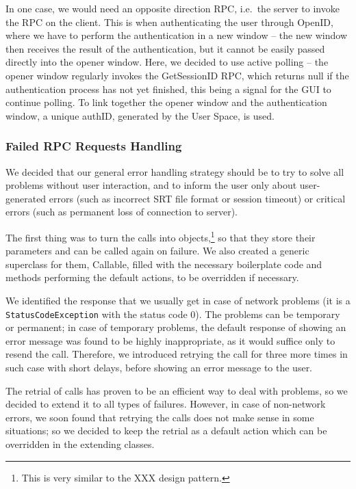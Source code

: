 In one case, we would need an opposite direction RPC, i.e.\ the server to invoke the RPC on the client. This is when authenticating the user through OpenID, where we have to perform the authentication in a new window -- the new window then receives the result of the authentication, but it cannot be easily passed directly into the opener window. Here, we decided to use active polling -- the opener window regularly invokes the GetSessionID RPC, which returns null if the authentication process has not yet finished, this being a signal for the GUI to continue polling. To link together the opener window and the authentication window, a unique authID, generated by the User Space, is used.

\subsubsection{Failed RPC Requests Handling}

We decided that our general error handling strategy should be to try to solve all problems without user interaction, and to inform the user only about user-generated errors (such as incorrect SRT file format or session timeout) or critical errors (such as permanent loss of connection to server).

The first thing was to turn the calls into objects,\footnote{This is very similar to the XXX design pattern. %
} so that they store their parameters and can be called again on failure. We also created a generic superclass for them, Callable, filled with the necessary boilerplate code and methods performing the default actions, to be overridden if necessary.

We identified the response that we usually get in case of network problems (it is a {\tt StatusCodeException} with the status code 0). The problems can be temporary or permanent; in case of temporary problems, the default response of showing an error message was found to be highly inappropriate, as it would suffice only to resend the call. Therefore, we introduced retrying the call for three more times in such case with short delays, before showing an error message to the user.

The retrial of calls has proven to be an efficient way to deal with problems, so we decided to extend it to all types of failures. However, in case of non-network errors, we soon found that retrying the calls does not make sense in some situations; so we decided to keep the retrial as a default action which can be overridden in the extending classes.

